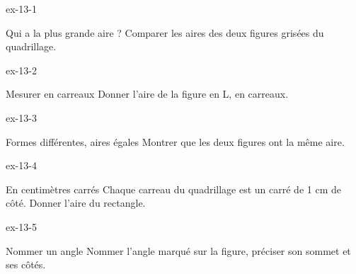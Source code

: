 \clearpage{}
\begin{blocLivre}{ex-13-1}\begin{exercice}[1]{Qui a la plus grande aire ?}
Comparer les aires des deux figures grisées du quadrillage.
\label{fig-ex-13-1}
\end{exercice}\end{blocLivre}
\begin{blocLivre}{ex-13-2}\begin{exercice}[1]{Mesurer en carreaux}
Donner l’aire de la figure en L, en carreaux.
\label{fig-ex-13-2}
\end{exercice}\end{blocLivre}
\begin{blocLivre}{ex-13-3}\begin{exercice}[1]{Formes différentes, aires égales}
Montrer que les deux figures ont la même aire.
\label{fig-ex-13-3}
\end{exercice}\end{blocLivre}
\begin{blocLivre}{ex-13-4}\begin{exercice}[1]{En centimètres carrés}
Chaque carreau du quadrillage est un carré de 1 cm de côté. Donner l’aire du rectangle.
\label{fig-ex-13-4}
\end{exercice}\end{blocLivre}
\begin{blocLivre}{ex-13-5}\begin{exercice}[1]{Nommer un angle}
Nommer l’angle marqué sur la figure, préciser son sommet et ses côtés.
\label{fig-ex-13-5}
\end{exercice}\end{blocLivre}

